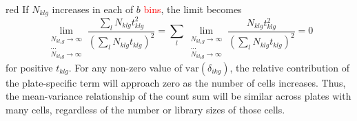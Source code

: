\documentclass{article}
\newcommand\revised[1]{\textcolor{red}{#1}}
\begin{document}
\begin{color}{red}
If $N_{klg}$ increases in each of $b$ \revised{bins}, the limit becomes
\[
    \lim_{\substack{N_{kl_1g} \to \infty \\ \dots \\ N_{kl_bg} \to \infty}} \frac{\sum_{l} N_{klg} t_{klg}^2}{ (\sum_{l} N_{klg} t_{klg})^2} 
    = \sum_{l} \lim_{\substack{N_{kl_1g} \to \infty \\ \dots \\ N_{kl_bg} \to \infty}} \frac{N_{klg} t_{klg}^2}{ (\sum_{l} N_{klg} t_{klg})^2} 
= 0
\]
for positive $t_{klg}$.
For any non-zero value of $\mbox{var}(\delta_{ikg})$, the relative contribution of the plate-specific term will approach zero as the number of cells increases.
Thus, the mean-variance relationship of the count sum will be similar across plates with many cells, regardless of the number or library sizes of those cells.
\end{color}



\end{document}
